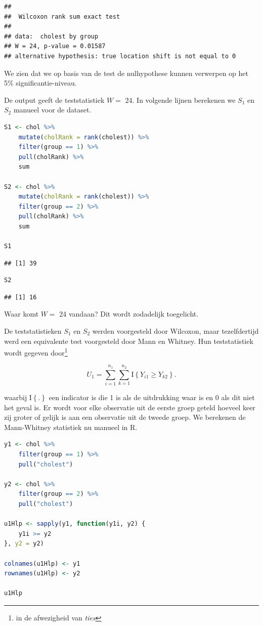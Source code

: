 \documentclass[
  12pt,dutch,coursenotes]{book}
\begin{document}
\begin{lstlisting}
## 
##  Wilcoxon rank sum exact test
## 
## data:  cholest by group
## W = 24, p-value = 0.01587
## alternative hypothesis: true location shift is not equal to 0
\end{lstlisting}

We zien dat we op basis van de test de nulhypothese kunnen verwerpen op het 5\% significantie-niveau.

De output geeft de teststatistiek \(W=\) 24.
In volgende lijnen berekenen we \(S_1\) en \(S_2\) manueel voor de dataset.

\begin{lstlisting}[language=R]
S1 <- chol %>%
    mutate(cholRank = rank(cholest)) %>%
    filter(group == 1) %>%
    pull(cholRank) %>%
    sum

S2 <- chol %>%
    mutate(cholRank = rank(cholest)) %>%
    filter(group == 2) %>%
    pull(cholRank) %>%
    sum

S1
\end{lstlisting}

\begin{lstlisting}
## [1] 39
\end{lstlisting}

\begin{lstlisting}[language=R]
S2
\end{lstlisting}

\begin{lstlisting}
## [1] 16
\end{lstlisting}

Waar komt \(W=\) 24 vandaan? Dit wordt zodadelijk toegelicht.

De teststatistieken \(S_1\) en \(S_2\) werden voorgesteld door Wilcoxon, maar tezelfdertijd werd een equivalente test voorgesteld door Mann en Whitney. Hun teststatistiek wordt gegeven door\footnote{in de afwezigheid van \emph{ties}}

\[
 U_1 = \sum_{i=1}^{n_1}\sum_{k=1}^{n_2} \text{I}\left\{Y_{i1}\geq Y_{k2}\right\}.
\]

waarbij \(\text{I}\left\{.\right\}\) een indicator is die 1 is als de uitdrukking waar is en 0 als dit niet het geval is.
Er wordt voor elke observatie uit de eerste groep geteld hoeveel keer zij groter of gelijk is aan een observatie uit de tweede groep.
We berekenen de Mann-Whitney statistiek nu manueel in R.

\begin{lstlisting}[language=R]
y1 <- chol %>%
    filter(group == 1) %>%
    pull("cholest")

y2 <- chol %>%
    filter(group == 2) %>%
    pull("cholest")

u1Hlp <- sapply(y1, function(y1i, y2) {
    y1i >= y2
}, y2 = y2)

colnames(u1Hlp) <- y1
rownames(u1Hlp) <- y2

u1Hlp
\end{lstlisting}
\end{document}
